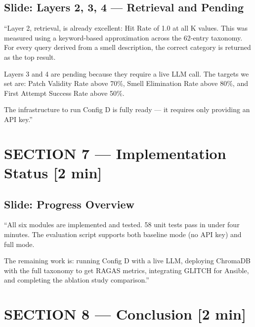 \documentclass[12pt,a4paper]{article}
\newcommand{\timing}[1]{{\color{slidegold}\textbf{[#1]}}}
\begin{document}
\subsection{Slide: Layers 2, 3, 4 --- Retrieval and Pending}

\begin{saybox}
``Layer 2, retrieval, is already excellent: Hit Rate of 1.0 at all K values.
This was measured using a keyword-based approximation across the 62-entry taxonomy.
For every query derived from a smell description, the correct category is returned
as the top result.

Layers 3 and 4 are pending because they require a live LLM call.
The targets we set are: Patch Validity Rate above 70\%,
Smell Elimination Rate above 80\%, and First Attempt Success Rate above 50\%.

The infrastructure to run Config D is fully ready ---
it requires only providing an API key.''
\end{saybox}

\section{SECTION 7 --- Implementation Status \timing{2 min}}

\subsection{Slide: Progress Overview}

\begin{saybox}
``All six modules are implemented and tested.
58 unit tests pass in under four minutes.
The evaluation script supports both baseline mode (no API key) and full mode.

The remaining work is: running Config D with a live LLM, deploying ChromaDB
with the full taxonomy to get RAGAS metrics, integrating GLITCH for Ansible,
and completing the ablation study comparison.''
\end{saybox}

\section{SECTION 8 --- Conclusion \timing{2 min}}
\end{document}
